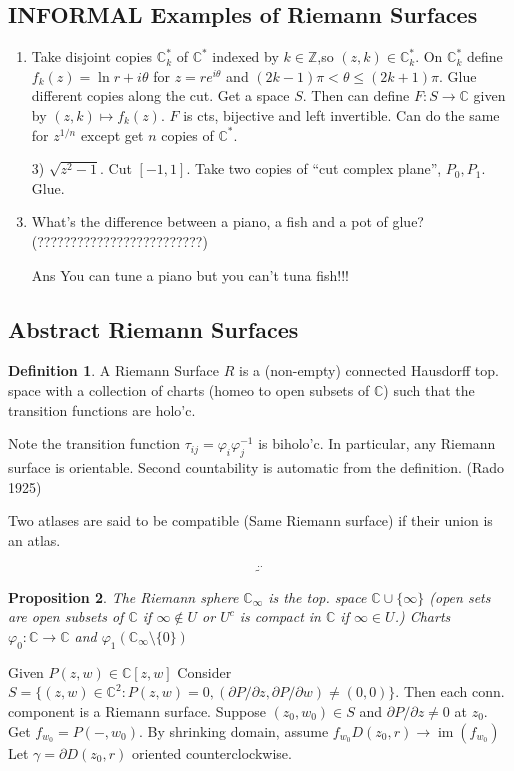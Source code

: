 \documentclass{article}
\theoremstyle{definition}
\newtheorem{defn}{Definition}[section]
\theoremstyle{remark}
\theoremstyle{plain}
\newtheorem{prop}[defn]{Proposition}
\newcommand{\ZZ}{\mathbb{Z}}
\newcommand{\CC}{\mathbb{C}}
\newcommand{\im}{\operatorname{im}}
\begin{document}
\subsection{INFORMAL Examples of Riemann Surfaces}
\begin{enumerate}[1)]
    \item Take disjoint copies $\CC_k^\ast$ of $\CC^\ast$ indexed by $k\in\ZZ$,so $(z,k)\in\CC_k^\ast$. On $\CC_k^\ast$ define $f_k(z)=\ln r+i\theta$ for $z=re^{i\theta}$ and $(2k-1)\pi<\theta\le(2k+1)\pi$. Glue different copies along the cut. Get a space $S$. Then can define $F:S\to\CC$ given by $(z,k)\mapsto f_k(z)$. $F$ is cts, bijective and left invertible. Can do the same for $z^{1/n}$ except get $n$ copies of $\CC^\ast$.
    \item[3)] $\sqrt{z^2-1}$. Cut $[-1,1]$. Take two copies of ``cut complex plane'', $P_0,P_1$. Glue.
    \item What's the difference between a piano, a fish and a pot of glue? (?????????????????????????)
    \item[Ans] You can tune a piano but you can't tuna fish!!!
\end{enumerate}
\subsection{Abstract Riemann Surfaces}
\begin{defn}
    A Riemann Surface $R$ is a (non-empty) connected Hausdorff top. space with a collection of charts (homeo to open subsets of $\CC$) such that the transition functions are holo'c.
\end{defn}
Note the transition function $\tau_{ij}=\varphi_i\varphi_j^{-1}$ is biholo'c. In particular, any Riemann surface is orientable. Second countability is automatic from the definition. (Rado 1925)

Two atlases are said to be compatible (Same Riemann surface) if their union is an atlas.

\[\overset{..}{\tilde{}}\tag{Owen's Signature}\]

\begin{prop}
    The Riemann sphere $\CC_\infty$ is the top. space $\CC\cup\{\infty\}$ (open sets are open subsets of $\CC$ if $\infty\not\in U$ or $U^c$ is compact in $\CC$ if $\infty\in U$.) Charts $\varphi_0:\CC\to\CC$ and $\varphi_1(\CC_\infty\setminus\{0\})$
\end{prop}

Given $P(z,w)\in\CC[z,w]$ Consider $S=\{(z,w)\in\CC^2:P(z,w)=0,(\partial P/\partial z,\partial P/\partial w)\neq (0,0)\}$. Then each conn. component is a Riemann surface. Suppose $(z_0,w_0)\in S$ and $\partial P/\partial z\neq 0$ at $z_0$. Get $f_{w_0}=P(-,w_0)$. By shrinking domain, assume $f_{w_0}D(z_0,r)\to\im(f_{w_0})$ Let $\gamma=\partial D(z_0,r)$ oriented counterclockwise.
\end{document}

